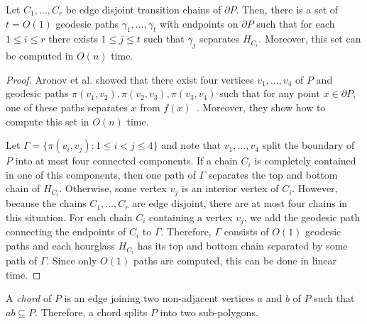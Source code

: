 \documentclass[a4paper,UKenglish]{lipics}
\newcommand{\ff}[1]{\ensuremath{f(#1)}}
\newcommand{\p}[2]{\ensuremath{\pi(#1, #2)}}
\begin{document}
\begin{lemma}\label{lemma:Split paths}
Let $C_1, \ldots, C_r$ be edge disjoint transition chains of $\partial P$. Then, there is a set of $t = O(1)$ geodesic paths $\gamma_1, \ldots, \gamma_t$ with endpoints on $\partial P$ such that for each $1\leq i\leq r$ there exists $1\leq j\leq t$ such that $\gamma_j$ separates $H_{C_i}$.
Moreover, this set can be computed in $O(n)$ time.
\end{lemma}
\begin{proof}
Aronov et al. showed that there exist four vertices $v_1, \ldots, v_4$ of $P$ and geodesic paths $\p{v_1}{v_2}, \p{v_2}{v_3}, \p{v_3}{v_4}$ such that for any point $x\in \partial P$, one of these paths separates $x$ from $\ff{x}$~\cite[Lemma 2.7.6]{aronov1993furthest}. Moreover, they show how to compute this set in $O(n)$ time.

Let $\Gamma= \{\p{v_i}{v_j} : 1\leq i < j\leq 4\}$ and note that $v_1, \ldots, v_4$ split the boundary of $P$ into at most four connected components.
If a chain $C_i$ is completely contained in one of this components, then one path of $\Gamma$ separates the top and bottom chain of $H_{C_i}$. Otherwise, some vertex $v_j$ is an interior vertex of $C_i$. However, because the chains $C_1, \ldots, C_r$ are edge disjoint, there are at most four chains in this situation. 
For each chain $C_i$ containing a vertex $v_j$, we add the geodesic path connecting the endpoints of $C_i$ to $\Gamma$.
Therefore, $\Gamma$ consists of $O(1)$ geodesic paths and each hourglass $H_{C_i}$ has its top and bottom chain separated by some path of $\Gamma$.
Since only $O(1)$ paths are computed, this can be done in linear time.
\end{proof}

A \emph{chord} of $P$ is an edge joining two non-adjacent vertices $a$ and $b$ of $P$ such that $ab\subseteq P$. Therefore, a chord splits $P$ into two sub-polygons.
\end{document}
